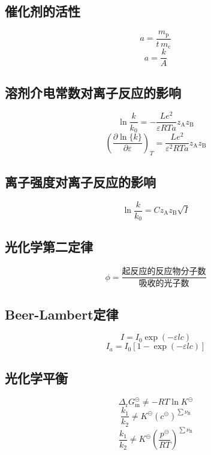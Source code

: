 \documentclass[twocolumn]{article}
\newcommand{\equ}[1]{\begin{equation*}#1\end{equation*}}
\newcommand{\drgm}{\Delta_{\mathrm{r}}G_{\rmm}}
\newcommand{\rmB}{\mathrm{B}}
\newcommand{\rmm}{\mathrm{m}}
\newcommand{\subB}{_{\rmB}}
\newcommand{\std}{^{\circleddash}}
\newcommand{\nuB}{\nu\subB}
\newcommand{\xkh}[1]{\left(#1\right)}
\newcommand{\pf}{^{2}}
\begin{document}
\subsection{催化剂的活性}
\equ{a=\frac{m_{\mathrm{p}}}{t\,m_{\mathrm{c}}}}
\equ{a=\frac{k}{A}}
\subsection{溶剂介电常数对离子反应的影响}
\equ{\ln \frac{k}{k_{0}}=-\frac{Le\pf}{\varepsilon RTa}z_{\mathrm{A}}z_{\mathrm{B}}}
\equ{\xkh{\frac{\partial \ln\{k\}}{\partial \varepsilon}}_{T}=\frac{Le\pf}{\varepsilon\pf RTa}z_{\mathrm{A}}z_{\mathrm{B}}}
\subsection{离子强度对离子反应的影响}
\equ{\ln\frac{k}{k_{0}}=Cz_{\mathrm{A}}z_{\mathrm{B}}\sqrt{I}}
\subsection{光化学第二定律}
\equ{\phi=\frac{\text{起反应的反应物分子数}}{\text{吸收的光子数}}}
\subsection{Beer-Lambert定律}
\equ{I=I_{0}\exp\xkh{-\varepsilon lc}}
\equ{I_{a}=I_{0}\left[ 1-\exp\xkh{-\varepsilon lc} \right]}
\subsection{光化学平衡}
\equ{\drgm\std\neq -RT\ln K\std}
\equ{\frac{k_{1}}{k_{2}}\neq K\std\xkh{c\std}^{\sum\nuB}}
\equ{\frac{k_{1}}{k_{2}}\neq K\std\xkh{\frac{p\std}{RT}}^{\sum\nuB}}
\end{document}
